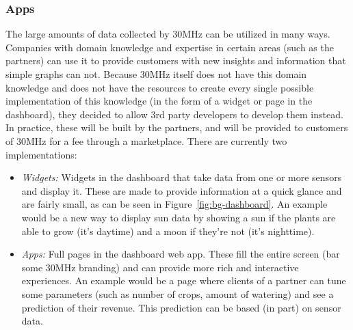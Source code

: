 \subsubsection{Apps}\label{sec:bg-apps}
The large amounts of data collected by 30MHz can be utilized in many ways. Companies with domain knowledge and expertise in certain areas (such as the partners) can use it to provide customers with new insights and information that simple graphs can not. Because 30MHz itself does not have this domain knowledge and does not have the resources to create every single possible implementation of this knowledge (in the form of a widget or page in the dashboard), they decided to allow 3rd party developers to develop them instead. In practice, these will be built by the partners, and will be provided to customers of 30MHz for a fee through a marketplace. There are currently two implementations:

\begin{itemize}
	\item \emph{Widgets:} Widgets in the dashboard that take data from one or more sensors and display it. These are made to provide information at a quick glance and are fairly small, as can be seen in Figure~\ref{fig:bg-dashboard}. An example would be a new way to display sun data by showing a sun if the plants are able to grow (it's daytime) and a moon if they're not (it's nighttime).
	\item \emph{Apps:} Full pages in the dashboard web app. These fill the entire screen (bar some 30MHz branding) and can provide more rich and interactive experiences. An example would be a page where clients of a partner can tune some parameters (such as number of crops, amount of watering) and see a prediction of their revenue. This prediction can be based (in part) on sensor data.
\end{itemize}

